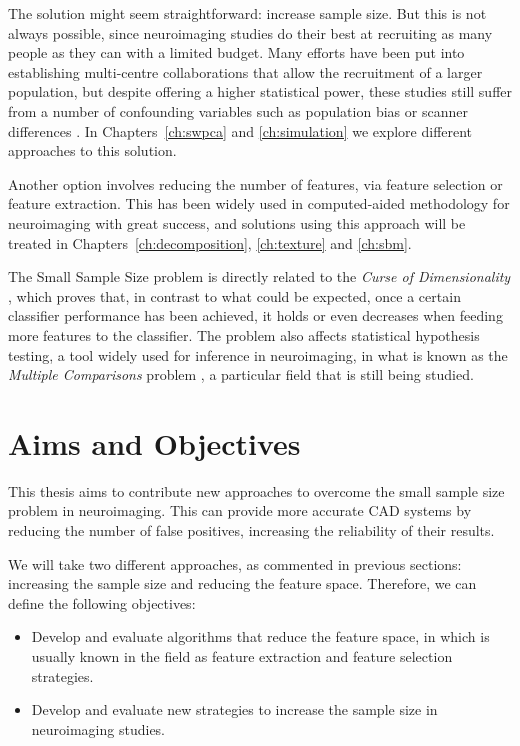 The solution might seem straightforward: increase sample size. But this is not always possible, since neuroimaging studies do their best at recruiting as many people as they can with a limited budget. Many efforts have been put into establishing multi-centre collaborations that allow the recruitment of a larger population, but despite offering a higher statistical power, these studies still suffer from a number of confounding variables such as population bias or scanner differences \cite{haar2014anatomical}. In Chapters~\ref{ch:swpca} and \ref{ch:simulation} we explore different approaches to this solution. 

Another option involves reducing the number of features, via feature selection or feature extraction. This has been widely used in computed-aided methodology for neuroimaging \cite{DeMartino2007,Xu2009,Gorriz2010,Illan2011,Martinez-Murcia2016} with great success, and solutions using this approach will be treated in Chapters~\ref{ch:decomposition}, \ref{ch:texture} and \ref{ch:sbm}. 

The Small Sample Size problem is directly related to the \textit{Curse of Dimensionality} \cite{Krishnaiah1982}, which proves that, in contrast to what could be expected, once a certain classifier performance has been achieved, it holds or even decreases when feeding more features to the classifier. The problem also affects statistical hypothesis testing, a tool widely used for inference in neuroimaging, in what is known as the \textit{Multiple Comparisons} problem \cite{Benjamini2010}, a particular field that is still being studied. 

\section{Aims and Objectives}\label{sec:overview}
This thesis aims to contribute new approaches to overcome the small sample size problem in neuroimaging. This can provide more accurate \ac{CAD} systems by reducing the number of false positives, increasing the reliability of their results. 

We will take two different approaches, as commented in previous sections: increasing the sample size and reducing the feature space. Therefore, we can define the following objectives: 

\begin{itemize}
	\item Develop and evaluate algorithms that reduce the feature space, in which is usually known in the field as feature extraction and feature selection strategies. 
	\item Develop and evaluate new strategies to increase the sample size in neuroimaging studies. 
\end{itemize}

